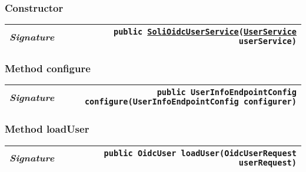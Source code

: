 \begin{adjustwidth}{1.5em}{0pt}
\begin{adjustwidth}{1.5em}{0pt}
{\begin{tabularx}{1.0\linewidth}{@{}l R@{}}
    \end{tabularx}}\subsubsection{Constructor\label{edu.kit.hci.soli.config.security.SoliOidcUserService@edu.kit.hci.soli.config.security.SoliOidcUserService(edu.kit.hci.soli.service.UserService)}}
    \begin{adjustwidth}{1.5em}{0pt}
      {\begin{tabularx}{1.0\linewidth}{@{}l R@{}}
        \emph{Signature} & \texttt{public \texttt{\hyperref[edu.kit.hci.soli.config.security.SoliOidcUserService]{\texttt{SoliOidcUserService}}}(\texttt{\hyperref[edu.kit.hci.soli.service.UserService]{\texttt{UserService}}} userService)} \\
        \hline
  
      \end{tabularx}}
    \end{adjustwidth}\subsubsection{Method configure\label{edu.kit.hci.soli.config.security.SoliOidcUserService@configure(OAuth2LoginConfigurer.UserInfoEndpointConfig)}}
    \begin{adjustwidth}{1.5em}{0pt}
      {\begin{tabularx}{1.0\linewidth}{@{}l R@{}}
        \emph{Signature} & \texttt{public \texttt{UserInfoEndpointConfig} configure(\texttt{UserInfoEndpointConfig} configurer)} \\
        \hline
  
      \end{tabularx}}
    \end{adjustwidth}\subsubsection{Method loadUser\label{edu.kit.hci.soli.config.security.SoliOidcUserService@loadUser(org.springframework.security.oauth2.client.oidc.userinfo.OidcUserRequest)}}
    \begin{adjustwidth}{1.5em}{0pt}
      {\begin{tabularx}{1.0\linewidth}{@{}l R@{}}
        \emph{Signature} & \texttt{public \texttt{OidcUser} loadUser(\texttt{OidcUserRequest} userRequest)} \\
        \hline
  

\end{tabularx}}
\end{adjustwidth}
\end{adjustwidth}
\end{adjustwidth}
